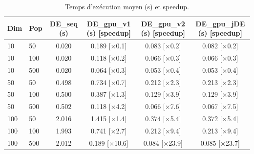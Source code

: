 \begin{table}[t]
\centering
\caption{Temps d'exécution moyen (s) et speedup.}
\label{tab:time}
\scriptsize
\begin{tabular}{llcccc}
\toprule
Dim & Pop & DE\_seq (s) & DE\_gpu\_v1 (s) [speedup] & DE\_gpu\_v2 (s) [speedup] & DE\_gpu\_jDE (s) [speedup] \\
\midrule
10 & 50 & 0.020 & 0.189 [$\times$0.1] & 0.083 [$\times$0.2] & 0.082 [$\times$0.2] \\
10 & 100 & 0.020 & 0.118 [$\times$0.2] & 0.066 [$\times$0.3] & 0.066 [$\times$0.3] \\
10 & 500 & 0.020 & 0.064 [$\times$0.3] & 0.053 [$\times$0.4] & 0.053 [$\times$0.4] \\
50 & 50 & 0.498 & 0.734 [$\times$0.7] & 0.212 [$\times$2.3] & 0.213 [$\times$2.3] \\
50 & 100 & 0.500 & 0.387 [$\times$1.3] & 0.129 [$\times$3.9] & 0.129 [$\times$3.9] \\
50 & 500 & 0.502 & 0.118 [$\times$4.2] & 0.066 [$\times$7.6] & 0.067 [$\times$7.5] \\
100 & 50 & 2.016 & 1.415 [$\times$1.4] & 0.374 [$\times$5.4] & 0.372 [$\times$5.4] \\
100 & 100 & 1.993 & 0.741 [$\times$2.7] & 0.212 [$\times$9.4] & 0.213 [$\times$9.4] \\
100 & 500 & 2.012 & 0.189 [$\times$10.6] & 0.084 [$\times$23.9] & 0.085 [$\times$23.7] \\
\bottomrule
\end{tabular}
\end{table}
